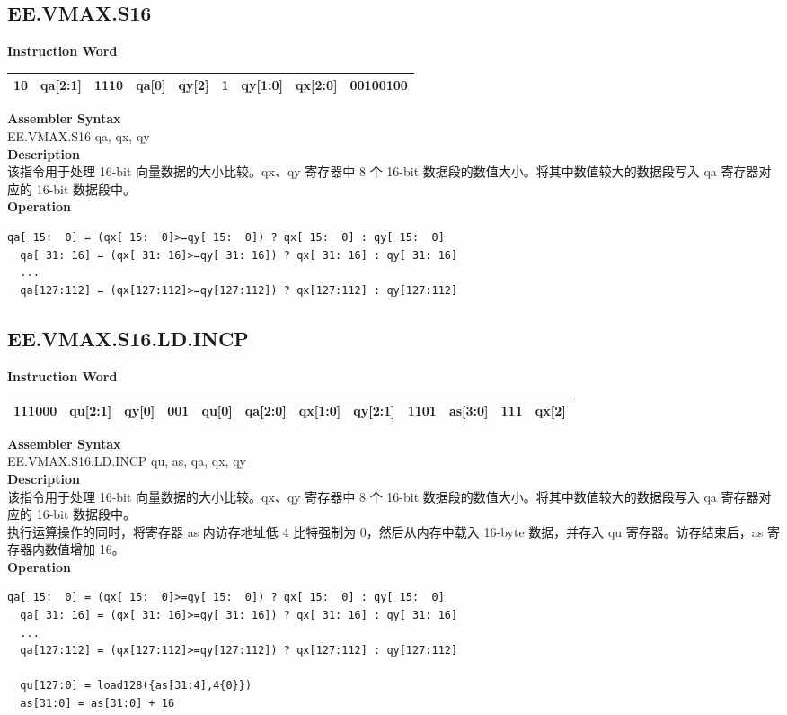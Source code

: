 \clearpage
\subsection{EE.VMAX.S16}\label{instruction:EEVMAXS16}
\setlength\tabcolsep{6pt}
\textbf{Instruction Word} \\
\begin{tabular}{|c|c|c|c|c|c|c|c|c|}
	\hline
	10 & qa[2:1] & 1110 & qa[0] & qy[2] & 1 & qy[1:0] & qx[2:0] & 00100100 \\
	\hline
\end{tabular}

\textbf{Assembler Syntax} \\
EE.VMAX.S16 qa, qx, qy \\
\textbf{Description} \\
该指令用于处理 16-bit 向量数据的大小比较。qx、qy 寄存器中 8 个 16-bit 数据段的数值大小。将其中数值较大的数据段写入 qa 寄存器对应的 16-bit 数据段中。\\
\textbf{Operation}
\begin{lstlisting}[escapeinside=`?]
  qa[ 15:  0] = (qx[ 15:  0]>=qy[ 15:  0]) ? qx[ 15:  0] : qy[ 15:  0]
  qa[ 31: 16] = (qx[ 31: 16]>=qy[ 31: 16]) ? qx[ 31: 16] : qy[ 31: 16]
  ...
  qa[127:112] = (qx[127:112]>=qy[127:112]) ? qx[127:112] : qy[127:112]
\end{lstlisting}

\clearpage
\subsection{EE.VMAX.S16.LD.INCP}\label{instruction:EEVMAXS16LDINCP}
\setlength\tabcolsep{6pt}
\textbf{Instruction Word} \\
\begin{tabular}{|c|c|c|c|c|c|c|c|c|c|c|c|}
	\hline
	111000 & qu[2:1] & qy[0] & 001 & qu[0] & qa[2:0] & qx[1:0] & qy[2:1] & 1101 & as[3:0] & 111 & qx[2] \\
	\hline
\end{tabular}

\textbf{Assembler Syntax} \\
EE.VMAX.S16.LD.INCP qu, as, qa, qx, qy \\
\textbf{Description} \\
该指令用于处理 16-bit 向量数据的大小比较。qx、qy 寄存器中 8 个 16-bit 数据段的数值大小。将其中数值较大的数据段写入 qa 寄存器对应的 16-bit 数据段中。\\
执行运算操作的同时，将寄存器 as 内访存地址低 4 比特强制为 0，然后从内存中载入 16-byte 数据，并存入 qu 寄存器。访存结束后，as 寄存器内数值增加 16。\\
\textbf{Operation}
\begin{lstlisting}[escapeinside=`?]
  qa[ 15:  0] = (qx[ 15:  0]>=qy[ 15:  0]) ? qx[ 15:  0] : qy[ 15:  0]
  qa[ 31: 16] = (qx[ 31: 16]>=qy[ 31: 16]) ? qx[ 31: 16] : qy[ 31: 16]
  ...
  qa[127:112] = (qx[127:112]>=qy[127:112]) ? qx[127:112] : qy[127:112]

  qu[127:0] = load128({as[31:4],4{0}})
  as[31:0] = as[31:0] + 16
\end{lstlisting}

